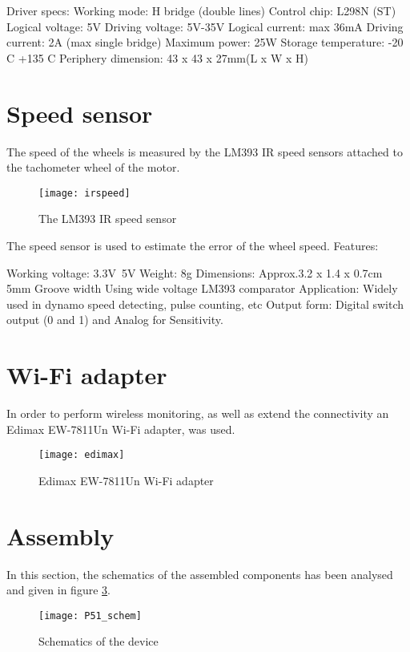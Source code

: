 Driver specs:
Working mode:	H bridge (double lines)
Control chip:	L298N (ST)
Logical voltage:	5V
Driving voltage:	5V-35V
Logical current:	max 36mA
Driving current:	2A (max single bridge)
Maximum power:	25W
Storage temperature:	-20 C +135 C
Periphery dimension:	43 x 43 x 27mm(L x W x H)

\section{Speed sensor}

The speed of the wheels is measured by the LM393 IR speed sensors attached to the tachometer wheel of the motor.

\begin{figure}[h]
\centering
\texttt{[image: irspeed]}
\caption{The LM393 IR speed sensor}
\label{fig::driver2}
\end{figure}

The speed sensor is used to estimate the error of the wheel speed.
Features:

Working voltage: 3.3V~5V
Weight: 8g
Dimensions: Approx.3.2 x 1.4 x 0.7cm
5mm Groove width
Using wide voltage LM393 comparator
Application: Widely used in dynamo speed detecting, pulse counting, etc
Output form: Digital switch output (0 and 1) and Analog for Sensitivity.


\section{Wi-Fi adapter}

In order to perform wireless monitoring, as well as extend the connectivity an Edimax EW-7811Un Wi-Fi adapter, was used. 

\begin{figure}[h]
\centering
\texttt{[image: edimax]}
\caption{Edimax EW-7811Un Wi-Fi adapter}
\label{fig::edimax}
\end{figure}

\section{Assembly}

In this section, the schematics of the assembled components has been analysed and given in figure \ref{fig::schematics}.

\begin{figure}[h] 
\centering
\texttt{[image: P51\_schem]}
\caption{Schematics of the device}
\label{fig::schematics}
\end{figure}

